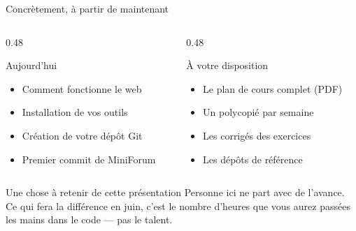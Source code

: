 \documentclass[aspectratio=169,11pt]{beamer}
\begin{document}
\begin{frame}{Concrètement, à partir de maintenant}
  \begin{columns}[T]
    \begin{column}{0.48\textwidth}
      \begin{block}{Aujourd'hui}
        \begin{itemize}
          \item Comment fonctionne le web
          \item Installation de vos outils
          \item Création de votre dépôt Git
          \item Premier commit de MiniForum
        \end{itemize}
      \end{block}
    \end{column}
    \begin{column}{0.48\textwidth}
      \begin{block}{À votre disposition}
        \begin{itemize}
          \item Le plan de cours complet (PDF)
          \item Un polycopié par semaine
          \item Les corrigés des exercices
          \item Les dépôts de référence
        \end{itemize}
      \end{block}
    \end{column}
  \end{columns}
  \vspace{0.4cm}
  \begin{exampleblock}{Une chose à retenir de cette présentation}
    Personne ici ne part avec de l'avance. Ce qui fera la différence en juin, c'est le nombre d'heures que vous aurez passées les mains dans le code --- pas le talent.
  \end{exampleblock}
\end{frame}

{
\begin{frame}[plain]
\end{frame}
}
\end{document}
